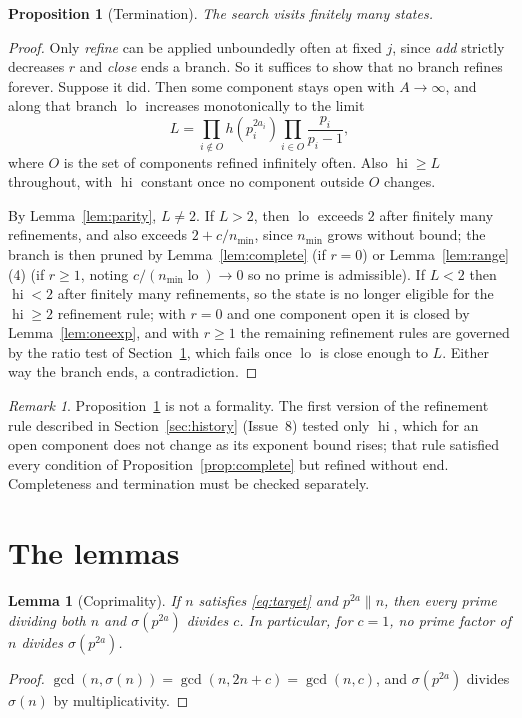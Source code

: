 \documentclass[11pt]{amsart}
\newtheorem{lemma}[theorem]{Lemma}
\newtheorem{proposition}[theorem]{Proposition}
\theoremstyle{remark}
\newtheorem{remark}[theorem]{Remark}
\DeclareMathOperator{\lo}{lo}
\DeclareMathOperator{\hi}{hi}
\begin{document}
\begin{proposition}[Termination]\label{prop:terminate}
The search visits finitely many states.
\end{proposition}
\begin{proof}
Only \emph{refine} can be applied unboundedly often at fixed $j$, since
\emph{add} strictly decreases $r$ and \emph{close} ends a branch. So it suffices
to show that no branch refines forever. Suppose it did. Then some component
stays open with $A \to \infty$, and along that branch $\lo$ increases
monotonically to the limit
\[
  L = \prod_{i \notin O} h(p_i^{2a_i}) \prod_{i \in O} \frac{p_i}{p_i-1},
\]
where $O$ is the set of components refined infinitely often. Also $\hi \ge L$
throughout, with $\hi$ constant once no component outside $O$ changes.

By Lemma~\ref{lem:parity}, $L \ne 2$. If $L > 2$, then $\lo$ exceeds $2$ after
finitely many refinements, and also exceeds $2 + c/n_{\min}$, since $n_{\min}$
grows without bound; the branch is then pruned by Lemma~\ref{lem:complete}
(if $r = 0$) or Lemma~\ref{lem:range}(4) (if $r \ge 1$, noting
$c/(n_{\min}\lo) \to 0$ so no prime is admissible). If $L < 2$ then
$\hi < 2$ after finitely many refinements, so the state is no longer eligible
for the $\hi \ge 2$ refinement rule; with $r = 0$ and one component open it is
closed by Lemma~\ref{lem:oneexp}, and with $r \ge 1$ the remaining refinement
rules are governed by the ratio test of Section~\ref{sec:lemmas}, which fails
once $\lo$ is close enough to $L$. Either way the branch ends, a contradiction.
\end{proof}

\begin{remark}
Proposition~\ref{prop:terminate} is not a formality. The first version of the
refinement rule described in Section~\ref{sec:history} (Issue~8) tested only
$\hi$, which for an open component does not change as its exponent bound rises;
that rule satisfied every condition of Proposition~\ref{prop:complete} but
refined without end. Completeness and termination must be checked separately.
\end{remark}

\section{The lemmas}\label{sec:lemmas}

\begin{lemma}[Coprimality]\label{lem:coprime}
If $n$ satisfies \eqref{eq:target} and $p^{2a} \parallel n$, then every prime
dividing both $n$ and $\sigma(p^{2a})$ divides $c$. In particular, for $c = 1$,
no prime factor of $n$ divides $\sigma(p^{2a})$.
\end{lemma}
\begin{proof}
$\gcd(n, \sigma(n)) = \gcd(n, 2n + c) = \gcd(n, c)$, and $\sigma(p^{2a})$
divides $\sigma(n)$ by multiplicativity.
\end{proof}
\end{document}
